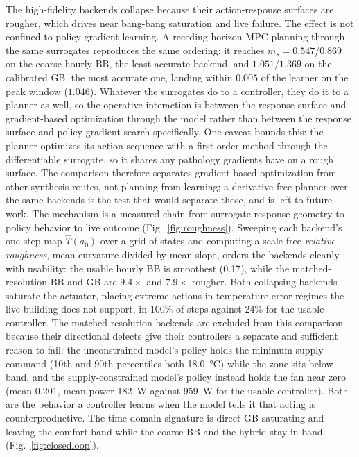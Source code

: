\documentclass[5p]{elsarticle}
\newcommand{\ms}{\ensuremath{m_s}}
\begin{document}
The high-fidelity backends collapse because their action-response surfaces are rougher, which drives
near bang-bang saturation and live failure. The effect is not confined to policy-gradient learning.
A receding-horizon MPC planning through the same surrogates reproduces the same ordering: it reaches
$\ms=0.547$/$0.869$ on the coarse hourly BB, the least accurate backend, and $1.051$/$1.369$ on the
calibrated GB, the most accurate one, landing within $0.005$ of the learner on the peak window
($1.046$). Whatever the surrogates do to a controller, they do it to a planner as well, so the
operative interaction is between the response surface and gradient-based optimization through the
model rather than between the response surface and policy-gradient search specifically. One caveat
bounds this: the planner optimizes its action sequence with a first-order method through the
differentiable surrogate, so it shares any pathology gradients have on a rough surface. The
comparison therefore separates gradient-based optimization from other synthesis routes, not planning
from learning; a derivative-free planner over the same backends is the test that would separate
those, and is left to future work. The mechanism is a measured chain from surrogate
response geometry to policy behavior to live outcome (Fig.~\ref{fig:roughness}). Sweeping each
backend's one-step map $\widehat{T}(a_0)$ over a grid of states and computing a scale-free
\emph{relative roughness}, mean curvature divided by mean slope, orders the backends cleanly with
usability: the usable hourly BB is smoothest (0.17), while the matched-resolution BB and GB are
$9.4\times$ and $7.9\times$ rougher. Both collapsing backends saturate the actuator, placing extreme
actions in temperature-error regimes the live building does not support, in 100\% of steps against
24\% for the usable controller. The matched-resolution backends are excluded from this comparison because their
directional defects give their controllers a separate and sufficient reason to fail: the
unconstrained model's policy holds the minimum supply command (10th and 90th percentiles both
\SI{18.0}{\celsius}) while the zone sits below band, and the supply-constrained model's policy
instead holds the fan near zero (mean \num{0.201}, mean power \SI{182}{\watt} against
\SI{959}{\watt} for the usable controller). Both are the behavior a controller learns when the
model tells it that acting is counterproductive. The time-domain signature is direct GB saturating and leaving the
comfort band while the coarse BB and the hybrid stay in band (Fig.~\ref{fig:closedloop}).
\end{document}

